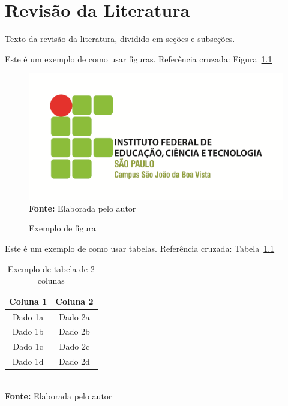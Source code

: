 \chapter{Revisão da Literatura}
\label{cap:02}

Texto da revisão da literatura, dividido em seções e subseções.


Este é um exemplo de como usar figuras. Referência cruzada: Figura~\ref{fig:exemplo}

\FloatBarrier
\begin{figure}[!htbp]
	\centering
	\caption{Exemplo de figura}
	\includegraphics[scale=1.5]{imagens/exemploFigura}
	\\\textbf{Fonte:} Elaborada pelo autor
	\label{fig:exemplo}
\end{figure}
\FloatBarrier


Este é um exemplo de como usar tabelas. Referência cruzada: Tabela~\ref{tab:exemplo}

\FloatBarrier
\begin{table}[!htbp]
\centering
\caption{Exemplo de tabela de 2 colunas}
	\begin{tabular}{ c | c }
		\hline
		\textbf{Coluna 1} & \textbf{Coluna 2} \\ \hline
		Dado 1a           & Dado 2a           \\ \hline
		Dado 1b           & Dado 2b           \\ \hline
		Dado 1c           & Dado 2c           \\ \hline
		Dado 1d           & Dado 2d           \\ \hline
	\end{tabular}
	\\ \vspace{0.2cm}
	\textbf{Fonte:} Elaborada pelo autor
	\label{tab:exemplo}
\end{table}
\FloatBarrier


